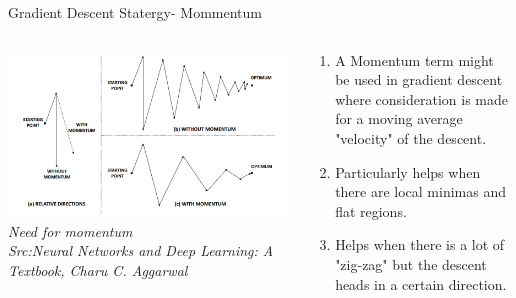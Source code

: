 \begin{frame}{Gradient Descent Statergy- Mommentum}
  \begin{columns}[T]
    \begin{column}{0.4\textwidth}
		\includegraphics[width=\textwidth]{images/momentum-zigzag.png}
        \tiny{\textit{Need for momentum\\ Src:Neural Networks and Deep Learning: A Textbook, Charu C. Aggarwal}}
    \end{column}
    \begin{column}{0.6\textwidth}
    \begin{enumerate}[$\bullet$]
      \item A Momentum term might be used in gradient descent where consideration is made for a moving average "velocity" of the descent.
      \item Particularly helps when there are local minimas and flat regions.
      \item  Helps when there is a lot of "zig-zag" but the descent heads in a certain direction.
      \end{enumerate}
      \end{column}
      \end{columns}
      \end{frame}

